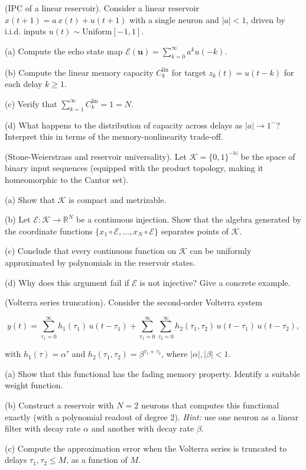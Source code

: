 \begin{exercise}
(IPC of a linear reservoir). Consider a linear reservoir
$x(t+1) = a\, x(t) + u(t+1)$ with a single neuron and $|a| < 1$, driven by i.i.d.
inputs $u(t) \sim \text{Uniform}[-1, 1]$.

(a) Compute the echo state map $\mathcal{E}(\mathbf{u}) = \sum_{k=0}^{\infty} a^k u(-k)$.

(b) Compute the linear memory capacity $C_k^{\text{lin}}$ for target $z_k(t) = u(t-k)$
for each delay $k \geq 1$.

(c) Verify that $\sum_{k=1}^{\infty} C_k^{\text{lin}} = 1 = N$.

(d) What happens to the distribution of capacity across delays as $|a| \to 1^-$?
Interpret this in terms of the memory-nonlinearity trade-off.
\end{exercise}


\begin{exercise}
(Stone-Weierstrass and reservoir universality). Let
$\mathcal{K} = \{0, 1\}^{-\mathbb{N}}$ be the space of binary input sequences (equipped
with the product topology, making it homeomorphic to the Cantor set).

(a) Show that $\mathcal{K}$ is compact and metrizable.

(b) Let $\mathcal{E}: \mathcal{K} \to \mathbb{R}^N$ be a continuous injection. Show
that the algebra generated by the coordinate functions $\{x_1 \circ \mathcal{E}, \ldots, x_N \circ \mathcal{E}\}$ separates points of $\mathcal{K}$.

(c) Conclude that every continuous function on $\mathcal{K}$ can be uniformly
approximated by polynomials in the reservoir states.

(d) Why does this argument fail if $\mathcal{E}$ is not injective? Give a concrete
example.
\end{exercise}


\begin{exercise}
(Volterra series truncation). Consider the second-order Volterra
system

\[
y(t) = \sum_{\tau_1=0}^{\infty} h_1(\tau_1)\, u(t-\tau_1) + \sum_{\tau_1=0}^{\infty}\sum_{\tau_2=0}^{\infty} h_2(\tau_1, \tau_2)\, u(t-\tau_1)\, u(t-\tau_2),
\]

with $h_1(\tau) = \alpha^\tau$ and $h_2(\tau_1, \tau_2) = \beta^{\tau_1 + \tau_2}$, where $|\alpha|, |\beta| < 1$.

(a) Show that this functional has the fading memory property. Identify a suitable weight function.

(b) Construct a reservoir with $N = 2$ neurons that computes this functional exactly
(with a polynomial readout of degree 2). \textit{Hint:} use one neuron as a linear filter
with decay rate $\alpha$ and another with decay rate $\beta$.

(c) Compute the approximation error when the Volterra series is truncated to delays
$\tau_1, \tau_2 \leq M$, as a function of $M$.
\end{exercise}


